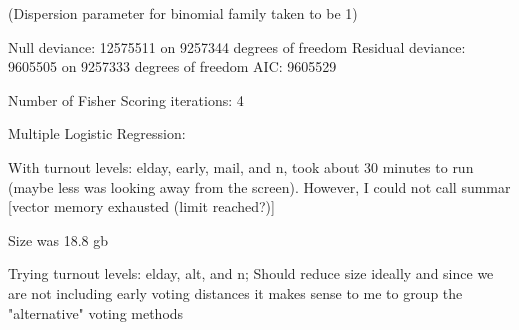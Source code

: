 (Dispersion parameter for binomial family taken to be 1)

    Null deviance: 12575511  on 9257344  degrees of freedom
Residual deviance:  9605505  on 9257333  degrees of freedom
AIC: 9605529

Number of Fisher Scoring iterations: 4


Multiple Logistic Regression:

With turnout levels: elday, early, mail, and n,
took about 30 minutes to run (maybe less was looking away from the screen).
However, I could not call summar [vector memory exhausted (limit reached?)]

Size was 18.8 gb

Trying turnout levels: elday, alt, and n;
Should reduce size ideally and since we are not including early voting distances
it makes sense to me to group the "alternative" voting methods
